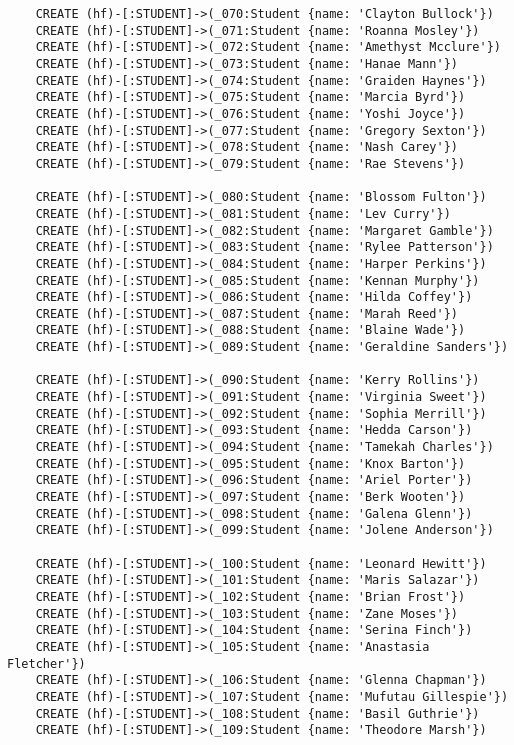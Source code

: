 \begin{lstlisting}
	CREATE (hf)-[:STUDENT]->(_070:Student {name: 'Clayton Bullock'})
	CREATE (hf)-[:STUDENT]->(_071:Student {name: 'Roanna Mosley'})
	CREATE (hf)-[:STUDENT]->(_072:Student {name: 'Amethyst Mcclure'})
	CREATE (hf)-[:STUDENT]->(_073:Student {name: 'Hanae Mann'})
	CREATE (hf)-[:STUDENT]->(_074:Student {name: 'Graiden Haynes'})
	CREATE (hf)-[:STUDENT]->(_075:Student {name: 'Marcia Byrd'})
	CREATE (hf)-[:STUDENT]->(_076:Student {name: 'Yoshi Joyce'})
	CREATE (hf)-[:STUDENT]->(_077:Student {name: 'Gregory Sexton'})
	CREATE (hf)-[:STUDENT]->(_078:Student {name: 'Nash Carey'})
	CREATE (hf)-[:STUDENT]->(_079:Student {name: 'Rae Stevens'})
	
	CREATE (hf)-[:STUDENT]->(_080:Student {name: 'Blossom Fulton'})
	CREATE (hf)-[:STUDENT]->(_081:Student {name: 'Lev Curry'})
	CREATE (hf)-[:STUDENT]->(_082:Student {name: 'Margaret Gamble'})
	CREATE (hf)-[:STUDENT]->(_083:Student {name: 'Rylee Patterson'})
	CREATE (hf)-[:STUDENT]->(_084:Student {name: 'Harper Perkins'})
	CREATE (hf)-[:STUDENT]->(_085:Student {name: 'Kennan Murphy'})
	CREATE (hf)-[:STUDENT]->(_086:Student {name: 'Hilda Coffey'})
	CREATE (hf)-[:STUDENT]->(_087:Student {name: 'Marah Reed'})
	CREATE (hf)-[:STUDENT]->(_088:Student {name: 'Blaine Wade'})
	CREATE (hf)-[:STUDENT]->(_089:Student {name: 'Geraldine Sanders'})
	
	CREATE (hf)-[:STUDENT]->(_090:Student {name: 'Kerry Rollins'})
	CREATE (hf)-[:STUDENT]->(_091:Student {name: 'Virginia Sweet'})
	CREATE (hf)-[:STUDENT]->(_092:Student {name: 'Sophia Merrill'})
	CREATE (hf)-[:STUDENT]->(_093:Student {name: 'Hedda Carson'})
	CREATE (hf)-[:STUDENT]->(_094:Student {name: 'Tamekah Charles'})
	CREATE (hf)-[:STUDENT]->(_095:Student {name: 'Knox Barton'})
	CREATE (hf)-[:STUDENT]->(_096:Student {name: 'Ariel Porter'})
	CREATE (hf)-[:STUDENT]->(_097:Student {name: 'Berk Wooten'})
	CREATE (hf)-[:STUDENT]->(_098:Student {name: 'Galena Glenn'})
	CREATE (hf)-[:STUDENT]->(_099:Student {name: 'Jolene Anderson'})
	
	CREATE (hf)-[:STUDENT]->(_100:Student {name: 'Leonard Hewitt'})
	CREATE (hf)-[:STUDENT]->(_101:Student {name: 'Maris Salazar'})
	CREATE (hf)-[:STUDENT]->(_102:Student {name: 'Brian Frost'})
	CREATE (hf)-[:STUDENT]->(_103:Student {name: 'Zane Moses'})
	CREATE (hf)-[:STUDENT]->(_104:Student {name: 'Serina Finch'})
	CREATE (hf)-[:STUDENT]->(_105:Student {name: 'Anastasia Fletcher'})
	CREATE (hf)-[:STUDENT]->(_106:Student {name: 'Glenna Chapman'})
	CREATE (hf)-[:STUDENT]->(_107:Student {name: 'Mufutau Gillespie'})
	CREATE (hf)-[:STUDENT]->(_108:Student {name: 'Basil Guthrie'})
	CREATE (hf)-[:STUDENT]->(_109:Student {name: 'Theodore Marsh'})
	

\end{lstlisting}
